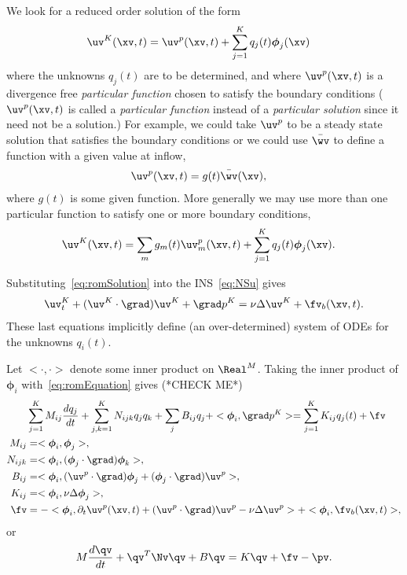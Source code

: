 \documentclass[11pt]{article}
\newcommand{\phiv}{\boldsymbol{\phi}}
\begin{document}
We look for a reduced order solution of the form
\begin{align}
   \uv^K(\xv,t) &= \uv^p(\xv,t) + \sum_{j=1}^K q_j(t)\phiv_j(\xv)  \label{eq:romSolution}
\end{align}
where the unknowns $q_j(t)$ are to be determined, and 
where $\uv^p(\xv,t)$ is a divergence free {\em particular function} chosen to satisfy the boundary conditions 
($\uv^p(\xv,t)$ is called a  {\em particular function} instead of a {\em particular solution} since it need not be
a solution.)
For example, we could take $\uv^p$ to be a steady state solution that satisfies the boundary
conditions or we could use $\wvBar$ to define a function with a given value at inflow,
\begin{align}
   \uv^p(\xv,t) &= g(t)\wvBar(\xv),
\end{align}
where $g(t)$ is some given function. 
More generally we may use more than one particular function to satisfy one or more boundary conditions,
\begin{align}
   \uv^K(\xv,t) &= \sum_m g_m(t)\uv^p_m(\xv,t)  + \sum_{j=1}^K q_j(t)\phiv_j(\xv)  . 
\end{align}


Substituting~\eqref{eq:romSolution} into the INS~\eqref{eq:NSu} gives
\begin{align}
   \uv^K_t + (\uv^K\cdot\grad)\uv^K + \grad p^K = \nu \Delta \uv^K + \fv_b(\xv,t).  \label{eq:romEquation}
\end{align}
These last equations implicitly define (an over-determined) system of ODEs for the unknowns $q_i(t)$. 


Let $<\cdot,\cdot>$ denote some inner product on $\Real^M$. 
Taking the inner product of $\phiv_i$ with~\eqref{eq:romEquation} gives (*CHECK ME*)
\begin{align}
  &   \sum_{j=1}^K M_{ij} \frac{d q_j}{dt}  + \sum_{j,k=1}^K N_{ijk} q_j q_k + \sum_j B_{ij} q_j 
           + <\phiv_i,\grad p^K > =  \sum_{j=1}^K K_{ij} q_j(t)  + \fv \\
  M_{ij} &= <\phiv_i,\phiv_j>, \\
  N_{ijk} &= <\phiv_i, (\phiv_j\cdot\grad)\phiv_k > , \\
  B_{ij} & = <\phiv_i, (\uv^p\cdot\grad)\phiv_j + (\phiv_j\cdot\grad)\uv^p >, \\
  K_{ij} &= <\phiv_i,\nu\Delta \phiv_j>, \\
  \fv &=  - <\phiv_i, \partial_t \uv^p(\xv,t) + (\uv^p\cdot\grad) \uv^p - \nu\Delta\uv^p > + <\phiv_i,\fv_b(\xv,t)>, 
\end{align}
or
\begin{align}
   M \frac{d\qv}{dt} + \qv^T \Nv \qv + B \qv = K \qv + \fv - \pv. \label{eq:romEquationProjected}
\end{align}
\end{document}
